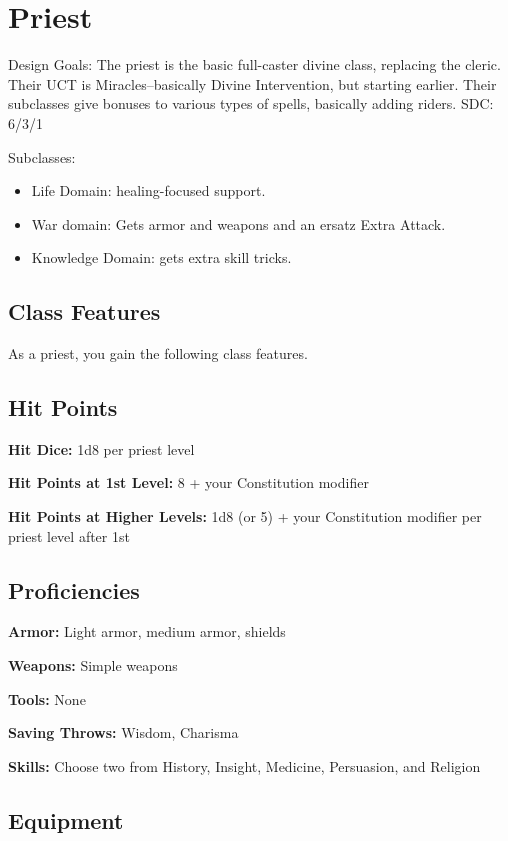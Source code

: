 \section{Priest}

Design Goals: The priest is the basic full-caster divine class, replacing the cleric. Their UCT is Miracles--basically Divine Intervention, but starting earlier. Their subclasses give bonuses to various types of spells, basically adding riders. SDC: 6/3/1

Subclasses:
\begin{itemize}
	\item Life Domain: healing-focused support.
	\item War domain: Gets armor and weapons and an ersatz Extra Attack.
	\item Knowledge Domain: gets extra skill tricks.
\end{itemize}

\subsection{Class Features}

As a priest, you gain the following class features.

\subsection{Hit Points}

\textbf{Hit Dice:} 1d8 per priest level

\textbf{Hit Points at 1st Level:} 8 + your Constitution modifier

\textbf{Hit Points at Higher Levels:} 1d8 (or 5) + your Constitution modifier per priest level after 1st

\subsection{Proficiencies}

\textbf{Armor:} Light armor, medium armor, shields

\textbf{Weapons:} Simple weapons

\textbf{Tools:} None

\textbf{Saving Throws:} Wisdom, Charisma

\textbf{Skills:} Choose two from History, Insight, Medicine, Persuasion, and Religion

\subsection{Equipment}

